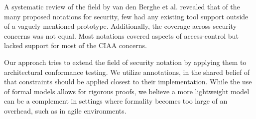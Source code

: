 A systematic review of the field by van den Berghe et al. \cite{vandenberghe_design_2017} revealed that of the many proposed notations for security, few had any existing tool support outside of a vaguely mentioned prototype. Additionally, the coverage across security concerns was not equal. Most notations covered aspects of access-control but lacked support for most of the CIAA concerns. 

Our approach tries to extend the field of security notation by applying them to architectural conformance testing. We utilize annotations, in the shared belief of \cite{sabo_preserving_2009} that constraints should be applied closest to their implementation. While the use of formal models allows for rigorous proofs, we believe a more lightweight model can be a complement in settings where formality becomes too large of an overhead, such as in agile environments. 